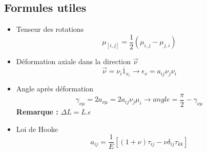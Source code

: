 \subsection*{Formules utiles}
\begin{itemize}
	\item Tenseur des rotations
	      \begin{equation}
	      	\mu _{[i,j]} = \frac{1}{2}(\mu _{i,j} - \mu _{j,i})
	      \end{equation}
	      		
	\item Déformation axiale dans la direction $\vec{\nu}$
	      \begin{equation}
	      	\vec{\nu} = \nu _i \overline{1}_{x_i} \rightarrow \epsilon _{\nu} = a_{ij} \nu _j \nu _i
	      \end{equation}
	      		
	\item	Angle après déformation 
	      \begin{equation}
	      	\gamma _{\nu \mu} = 2 a_{\nu \mu} = 2 a_{ij} \nu _j \mu _i \rightarrow angle = \frac{\pi}{2} - \gamma _{\nu \mu} 
	      \end{equation}
	      \textbf{Remarque :} $\Delta L = L.\epsilon$		
	\item Loi de Hooke
	      \begin{equation}
	      	a_{ij} = \frac{1}{E}[(1+\nu)\tau _{ij} - \nu \delta _{ij}\tau _{kk}]
	      \end{equation}							
\end{itemize}

